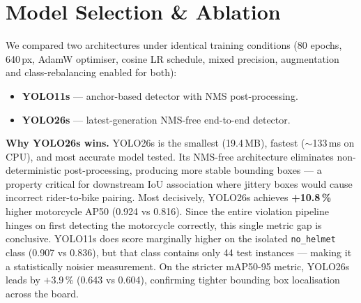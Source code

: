 \documentclass[10pt,a4paper,twocolumn]{article}
\begin{document}
\section{Model Selection \& Ablation}
We compared two architectures under identical training conditions (80 epochs, 640\,px, AdamW optimiser, cosine LR schedule, mixed precision, augmentation and class-rebalancing enabled for both):
\begin{itemize}
  \item \textbf{YOLO11s} — anchor-based detector with NMS post-processing.
  \item \textbf{YOLO26s} — latest-generation NMS-free end-to-end detector.
\end{itemize}

\begin{table}[H]
\centering
\setlength{\tabcolsep}{3.5pt}
\caption{Test split (194 images). Bold = winner per class. Inference: 133\,ms (YOLO26s) vs 135\,ms (YOLO11s) on CPU.}
\end{table}

\textbf{Why YOLO26s wins.} YOLO26s is the smallest (19.4\,MB), fastest ($\sim$133\,ms on CPU), and most accurate model tested. Its NMS-free architecture eliminates non-deterministic post-processing, producing more stable bounding boxes — a property critical for downstream IoU association where jittery boxes would cause incorrect rider-to-bike pairing. Most decisively, YOLO26s achieves \textbf{+10.8\,\%} higher motorcycle AP50 (0.924 vs 0.816). Since the entire violation pipeline hinges on first detecting the motorcycle correctly, this single metric gap is conclusive. YOLO11s does score marginally higher on the isolated \texttt{no\_helmet} class (0.907 vs 0.836), but that class contains only 44 test instances — making it a statistically noisier measurement. On the stricter mAP50-95 metric, YOLO26s leads by $+$3.9\,\% (0.643 vs 0.604), confirming tighter bounding box localisation across the board.
\end{document}
